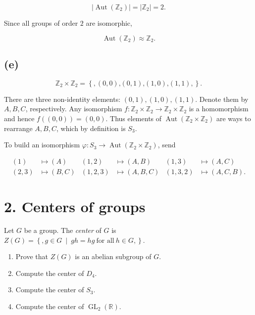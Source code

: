 \[\left| {\operatorname{Aut}\left( \mathbb{Z}_{2} \right)} \right| = \left| \mathbb{Z}_{2} \right| = 2.\]

Since all groups of order \(2\) are isomorphic,

\[\operatorname{Aut}\left( \mathbb{Z}_{2} \right) \approx \mathbb{Z}_{2}.\]

\subsection{(e)}

\[\mathbb{Z}_{2} \times \mathbb{Z}_{2} = \left\{ {,\left( {0,0} \right)\text{,}\left( {0,1} \right)\text{,}\left( {1,0} \right)\text{,}\left( {1,1} \right),} \right\}.\]

There are three non-identity elements: \(\left( {0,1} \right),\left( {1,0} \right),\left( {1,1} \right)\). Denote them by \(A,B,C\), respectively. Any isomorphism \(f:\mathbb{Z}_{2} \times \mathbb{Z}_{2}\rightarrow\mathbb{Z}_{2} \times \mathbb{Z}_{2}\) is a homomorphism and hence \(f\left( \left( {0,0} \right) \right) = \left( {0,0} \right)\). Thus elements of \(\operatorname{Aut}\left( {\mathbb{Z}_{2} \times \mathbb{Z}_{2}} \right)\) are ways to rearrange \(A,B,C\), which by definition is \(S_{3}\).

To build an isomorphism \(\varphi:S_{3}\rightarrow\operatorname{Aut}\left( {\mathbb{Z}_{2} \times \mathbb{Z}_{2}} \right)\), send

\[\begin{matrix}
(1) & {\mapsto(A)} & \left( {1,2} \right) & {\mapsto\left( {A,B} \right)} & \left( {1,3} \right) & {\mapsto\left( {A,C} \right)} \\
\left( {2,3} \right) & {\mapsto\left( {B,C} \right)} & \left( {1,2,3} \right) & {\mapsto\left( {A,B,C} \right)} & \left( {1,3,2} \right) & {\mapsto\left( {A,C,B} \right).}
\end{matrix}\]

\section{2. Centers of groups}

Let \(G\) be a group. The \emph{center} of \(G\) is \(Z(G) = \left\{ ,g \in G\  \middle| \ gh = hg\ \text{for all}\ h \in G, \right\}\).

\begin{enumerate}
\tightlist
\item
  Prove that \(Z(G)\) is an abelian subgroup of \(G\).
\item
  Compute the center of \(D_{4}\).
\item
  Compute the center of \(S_{3}\).
\item
  Compute the center of \(\operatorname{GL}_{2}\left( \mathbb{R} \right)\).
\end{enumerate}

